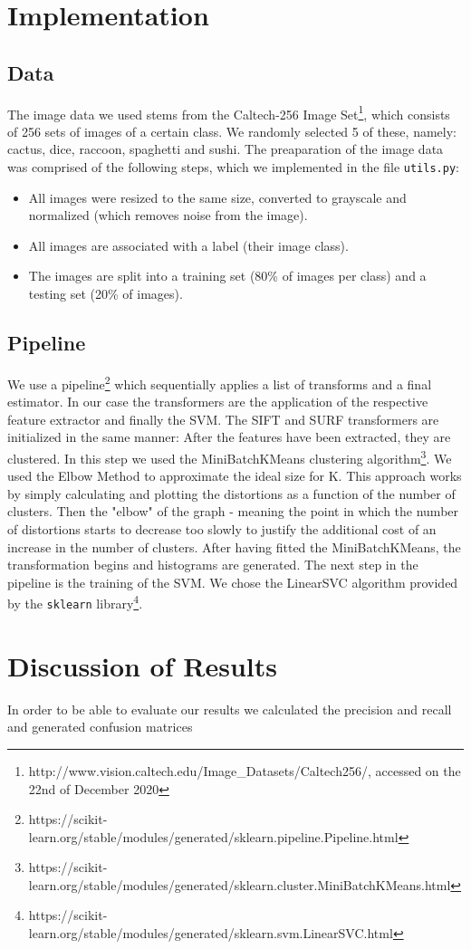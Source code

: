 \documentclass{scrartcl}
\begin{document}
\section{Implementation}
\subsection{Data}
The image data we used stems from the Caltech-256 Image Set\footnote{http://www.vision.caltech.edu/Image\_Datasets/Caltech256/, accessed on the 22nd of December 2020}, which consists of 256 sets of images of a certain class. We randomly selected 5 of these, namely: cactus, dice, raccoon, spaghetti and sushi. The preaparation of the image data was comprised of the following steps, which we implemented in the file \texttt{utils.py}:
\begin{itemize}
  \item All images were resized to the same size, converted to grayscale and normalized (which removes noise from the image).
  \item All images are associated with a label (their image class).
  \item The images are split into a training set (80\% of images per class) and a testing set (20\% of images).
\end{itemize}

\subsection{Pipeline}
We use a pipeline\footnote{https://scikit-learn.org/stable/modules/generated/sklearn.pipeline.Pipeline.html} which sequentially applies a list of transforms and a final estimator.
In our case the transformers are the application of the respective feature extractor and finally the SVM.
The SIFT and SURF transformers are initialized in the same manner: After the features have been extracted, they are clustered.
In this step we used the MiniBatchKMeans clustering algorithm\footnote{https://scikit-learn.org/stable/modules/generated/sklearn.cluster.MiniBatchKMeans.html}. We used the Elbow Method to approximate the ideal size for K.
This approach works by simply calculating and plotting the distortions as a function of the number of clusters. Then the "elbow" of the graph - meaning the point in which the number of distortions starts to decrease too slowly to justify the additional cost of an increase in the number of clusters.
After having fitted the MiniBatchKMeans, the transformation begins and histograms are generated.
The next step in the pipeline is the training of the SVM. We chose the LinearSVC algorithm provided by the \texttt{sklearn} library\footnote{https://scikit-learn.org/stable/modules/generated/sklearn.svm.LinearSVC.html}.

\section{Discussion of Results}
In order to be able to evaluate our results we calculated the precision and recall and generated confusion matrices

\printbibliography
\end{document}
